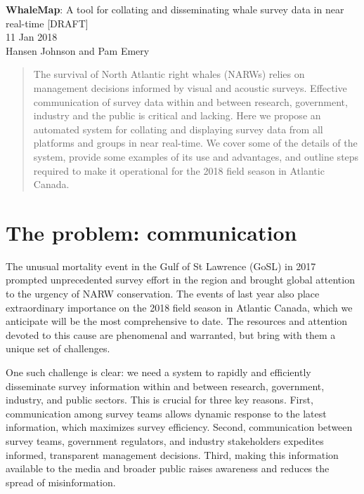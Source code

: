\documentclass[11pt, letterpaper]{article}
\begin{document}

\begin{center}
	\Large \textbf{WhaleMap}: A tool for collating and disseminating whale survey data in near real-time [DRAFT] \\
	\bigskip
	\normalsize 11 Jan 2018 \\
	\normalsize Hansen Johnson and Pam Emery\\
	\bigskip
\end{center}

\begin{abstract}
	The survival of North Atlantic right whales (NARWs) relies on management decisions informed by visual and acoustic surveys. Effective communication of survey data within and between research, government, industry and the public is critical and lacking. Here we propose an automated system for collating and displaying survey data from all platforms and groups in near real-time. We cover some of the details of the system, provide some examples of its use and advantages, and outline steps required to make it operational for the 2018 field season in Atlantic Canada.
\end{abstract} 


\section{The problem: communication}

The unusual mortality event in the Gulf of St Lawrence (GoSL) in 2017 prompted unprecedented survey effort in the region and brought global attention to the urgency of NARW conservation. The events of last year also place extraordinary importance on the 2018 field season in Atlantic Canada, which we anticipate will be the most comprehensive to date. The resources and attention devoted to this cause are phenomenal and warranted, but bring with them a unique set of challenges. 

One such challenge is clear: we need a system to rapidly and efficiently disseminate survey information within and between research, government, industry, and public sectors. This is crucial for three key reasons. First, communication among survey teams allows dynamic response to the latest information, which maximizes survey efficiency. Second, communication between survey teams, government regulators, and industry stakeholders expedites informed, transparent management decisions. Third, making this information available to the media and broader public raises awareness and reduces the spread of misinformation. 
\end{document}
